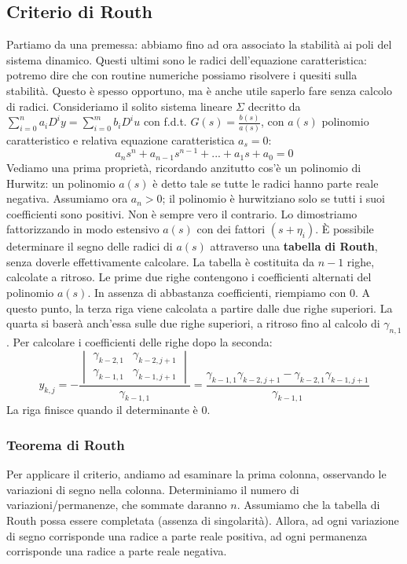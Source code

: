\documentclass[11pt]{article}
\begin{document}
\subsection{Criterio di Routh}
Partiamo da una premessa: abbiamo fino ad ora associato la stabilità ai poli del sistema dinamico. Questi ultimi sono le radici dell'equazione caratteristica: potremo dire che con routine numeriche possiamo risolvere i quesiti sulla stabilità. Questo è spesso opportuno, ma è anche utile saperlo fare senza calcolo di radici. Consideriamo il solito sistema lineare $\Sigma$ decritto da $\sum_{i=0}^n a_i D^i y = \sum_{i=0}^m b_i D^i u$ con f.d.t. $G(s)= \frac{b(s)}{a(s)}$, con $a(s)$ polinomio caratteristico e relativa equazione caratteristica $a_s=0$:
\begin{displaymath}
    a_ns^n+a_{n-1}s^{n-1}+...+a_1s+a_0=0
\end{displaymath}
Vediamo una prima proprietà, ricordando anzitutto cos'è un polinomio di Hurwitz: un polinomio $a(s)$ è detto tale se tutte le radici hanno parte reale negativa. Assumiamo ora $a_n>0$; il polinomio è hurwitziano solo se tutti i suoi coefficienti sono positivi. Non è sempre vero il contrario. Lo dimostriamo fattorizzando in modo estensivo $a(s)$ con dei fattori $(s+\eta_i)$.
È possibile determinare il segno delle radici di $a(s)$ attraverso una \textbf{tabella di Routh}, senza doverle effettivamente calcolare. La tabella è costituita da $n-1$ righe, calcolate a ritroso. Le prime due righe contengono i coefficienti alternati del polinomio $a(s)$. In assenza di abbastanza coefficienti, riempiamo con 0. A questo punto, la terza riga viene calcolata a partire dalle due righe superiori. La quarta si baserà anch'essa sulle due righe superiori, a ritroso fino al calcolo di $\gamma_{n,1}$. Per calcolare i coefficienti delle righe dopo la seconda:
\begin{displaymath}
    y_{k,j}=-\frac{\begin{vmatrix}
            \gamma_{k-2,1} & \gamma_{k-2,j+1} \\
            \gamma_{k-1,1} & \gamma_{k-1,j+1}
        \end{vmatrix}}{\gamma_{k-1,1}}
    = \frac{\gamma_{k-1,1}\gamma_{k-2,j+1} - \gamma_{k-2,1}\gamma_{k-1,j+1}}{\gamma_{k-1,1}}
\end{displaymath}
La riga finisce quando il determinante è 0.
\subsubsection{Teorema di Routh}
Per applicare il criterio, andiamo ad esaminare la prima colonna, osservando le variazioni di segno nella colonna. Determiniamo il numero di variazioni/permanenze, che sommate daranno $n$.
Assumiamo che la tabella di Routh possa essere completata (assenza di singolarità). Allora, ad ogni variazione di segno corrisponde una radice a parte reale positiva, ad ogni permanenza corrisponde una radice a parte reale negativa.
\end{document}
